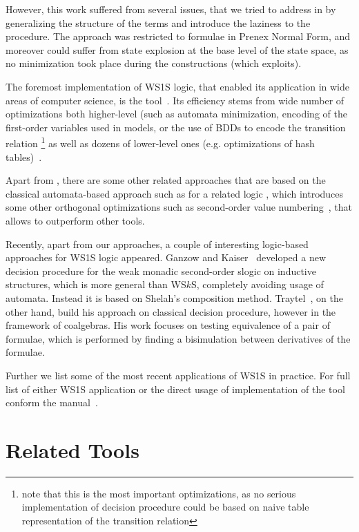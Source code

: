 However, this work suffered from several issues, that we tried to address in \gaston
by generalizing the structure of the terms and introduce the laziness to the procedure.
The approach was restricted to formulae in Prenex Normal Form, and moreover could
suffer from state explosion at the base level of the state space, as no minimization took
place during the constructions (which \mona exploits).

The foremost implementation of WS1S logic, that enabled its application in wide areas
of computer science, is the \mona tool~\cite{mona}. Its efficiency stems from wide
number of optimizations both higher-level (such as automata minimization, encoding of the
first-order variables used in models, or the use of BDDs to encode the transition relation
\footnote{note that this is the most important optimizations, as no serious implementation
of decision procedure could be based on naive table representation of the transition relation}
as well as dozens of lower-level ones (e.g. optimizations of hash tables)~\cite{mona:secrets,
mona:relativization}.

Apart from \mona, there are some other related approaches that are based on the classical
automata-based approach such as \jmosel \cite{jmosel} for a related logic \msl, which
introduces some other orthogonal optimizations such as second-order value numbering~\cite{jmosel:dag},
that allows \jmosel to outperform other tools.

Recently, apart from our approaches, a couple of interesting logic-based approaches 
for WS1S logic appeared. Ganzow and Kaiser~\cite{kaiser} developed a new decision procedure
for the weak monadic second-order slogic on inductive structures, which is more general
than WS$k$S, completely avoiding usage of automata. Instead it is based on Shelah's 
composition method. Traytel~\cite{traytel}, on the other hand, build his approach on
classical decision procedure, however in the framework of coalgebras. His work focuses
on testing equivalence of a pair of formulae, which is performed by finding a bisimulation
between derivatives of the formulae. 

Further we list some of  the most recent applications of WS1S in practice. For full list
of either WS1S application or the direct usage of implementation of the \mona tool conform
the \mona manual~\cite{mona:manual}.


\section{Related Tools}

